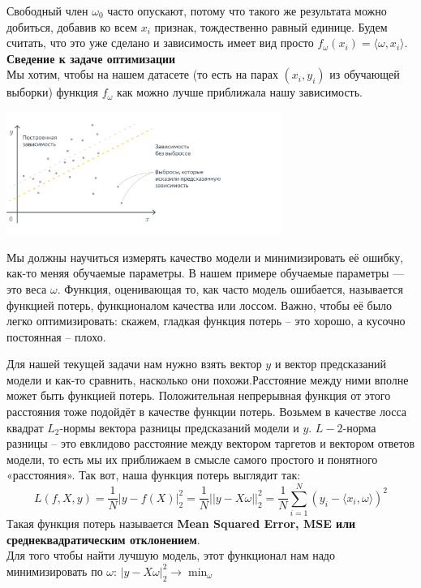Свободный член $\omega_0$ часто опускают, потому что такого же результата можно добиться, добавив ко всем $x_i$ признак, тождественно равный единице. Будем считать, что это уже сделано и зависимость имеет вид просто $f_\omega(x_i)=\langle\omega,x_i\rangle$. \\
\textbf{Сведение к задаче оптимизации} \\
Мы хотим, чтобы на нашем датасете (то есть на парах $(x_i, y_i)$ из обучающей выборки) функция $f_\omega$ как можно лучше приближала нашу зависимость.
\begin{center}
    \includegraphics[height=4cm]{pics/t_osn24_2.png}
\end{center}
Мы должны научиться измерять качество модели и минимизировать её ошибку, как-то меняя обучаемые параметры. В нашем примере обучаемые параметры — это веса $\omega$. Функция, оценивающая то, как часто модель ошибается, называется функцией потерь, функционалом качества или лоссом. Важно, чтобы её было легко оптимизировать: скажем, гладкая функция потерь – это хорошо, а кусочно постоянная – плохо.

Для нашей текущей задачи нам нужно взять вектор $y$ и вектор предсказаний модели и как-то сравнить, насколько они похожи.Расстояние между ними вполне может быть функцией потерь. Положительная непрерывная функция от этого расстояния тоже подойдёт в качестве функции потерь. Возьмем в качестве лосса квадрат $L_2$-нормы вектора разницы предсказаний модели и $y$. $L-2$-норма разницы – это евклидово расстояние между вектором таргетов и вектором ответов модели, то есть мы их приближаем в смысле самого простого и понятного «расстояния».
Так вот, наша функция потерь выглядит так:
\begin{equation*}
    L(f,X,y)=\frac{1}{N}|y-f(X)|_2^2=\frac{1}{N}||y-X\omega||_2^2 =\frac{1}{N}\sum_{i=1}^{N} (y_i-\langle x_i,\omega\rangle)^2
\end{equation*}
Такая функция потерь называется \textbf{Mean Squared Error, MSE или среднеквадратическим отклонением}. \\
Для того чтобы найти лучшую модель, этот функционал нам надо минимизировать по $\omega$: $|y-X\omega|_2^2 \xrightarrow{} \min_{\omega}$

